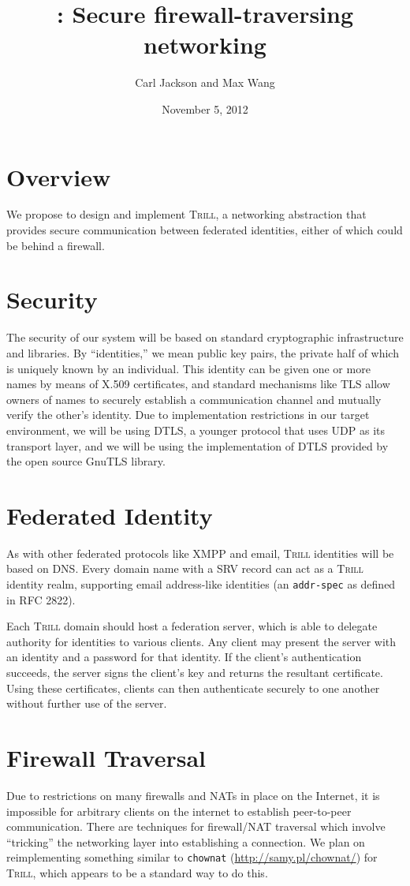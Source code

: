 \documentclass[12pt]{article}
\title{\Trill: Secure firewall-traversing networking}
\author{Carl Jackson and Max Wang}
\date{November 5, 2012}
\makeatletter
\newcommand{\Trill}{\textsc{Trill}\xspace}
\renewcommand{\maketitle}{%
  \thispagestyle{plain}%
  \begin{center}%
    {\LARGE \@title \par}%
    {\large \@author \par}%
    {\large \@date \par}%
  \end{center}%
}
\makeatother
\begin{document}
\maketitle

\section*{Overview}
We propose to design and implement \Trill, a networking abstraction that
provides secure communication between federated identities, either of which
could be behind a firewall.

\section*{Security}
The security of our system will be based on standard cryptographic
infrastructure and libraries. By ``identities,'' we mean public key pairs, the
private half of which is uniquely known by an individual. This identity can be
given one or more names by means of X.509 certificates, and standard mechanisms
like TLS allow owners of names to securely establish a communication channel
and mutually verify the other's identity. Due to implementation restrictions in
our target environment, we will be using DTLS, a younger protocol that uses UDP
as its transport layer, and we will be using the implementation of DTLS
provided by the open source GnuTLS library.

\section*{Federated Identity}
As with other federated protocols like XMPP and email, \Trill identities will
be based on DNS.  Every domain name with a SRV record can act as a \Trill
identity realm, supporting email address-like identities (an \verb!addr-spec!
as defined in RFC 2822).

Each \Trill domain should host a federation server, which is able to delegate
authority for identities to various clients.  Any client may present the server
with an identity and a password for that identity.  If the client's
authentication succeeds, the server signs the client's key and returns the
resultant certificate.  Using these certificates, clients can then authenticate
securely to one another without further use of the server.

\section*{Firewall Traversal}
Due to restrictions on many firewalls and NATs in place on the Internet, it is
impossible for arbitrary clients on the internet to establish peer-to-peer
communication. There are techniques for firewall/NAT traversal which involve
``tricking'' the networking layer into establishing a connection. We plan on
reimplementing something similar to \texttt{chownat}
(\url{http://samy.pl/chownat/}) for \Trill, which appears to be a standard way
to do this.
\end{document}
